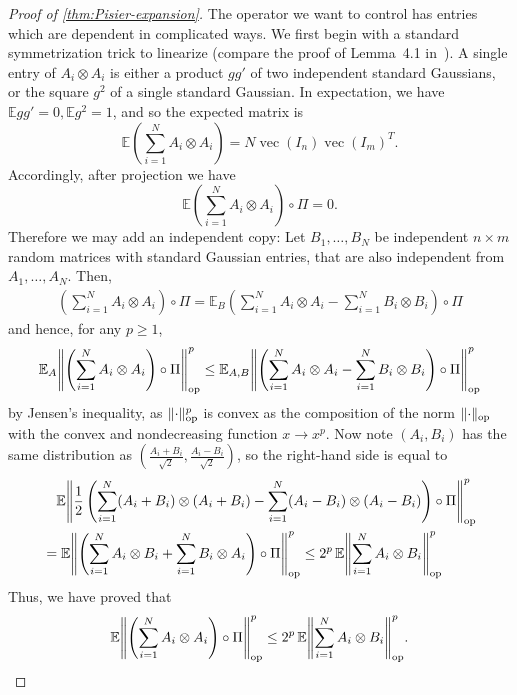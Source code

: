 \documentclass[aos]{imsart}
\theoremstyle{definition}
\numberwithin{equation}{section}
\DeclareMathOperator{\op}{op}
\DeclareMathOperator{\vect}{vec}
\DeclarePairedDelimiter{\norm}{\lVert}{\rVert}
\newcommand{\E}{\mathbb{E}}
\begin{document}
\begin{appendix}
\begin{proof} [Proof of \cref{thm:Pisier-expansion}]
The operator we want to control has entries which are dependent in complicated ways.
We first begin with a standard symmetrization trick to linearize (compare the proof of Lemma~4.1 in~\cite{P14}).
A single entry of $A_i \otimes A_i$ is either a product $g g'$ of two independent standard Gaussians, or the square $g^2$ of a single standard Gaussian.
In expectation, we have $\E g g' = 0, \E g^{2} = 1$, and so the expected matrix is
\[ \E \left( \sum_{i=1}^N A_i \otimes A_i \right) = N \vect(I_n) \vect(I_m)^T. \]
Accordingly, after projection we have
\[ \E \left( \sum_{i=1}^N A_i \otimes A_i \right) \circ \Pi = 0. \]
Therefore we may add an independent copy:
Let $B_1,\dots,B_N$ be independent $n\times m$ random matrices with standard Gaussian entries, that are also independent from~$A_1,\dots,A_N$.
Then,
\begin{align*}
  \left( \sum_{i=1}^N A_i \otimes A_i \right) \circ \Pi
= \E_B \left( \sum_{i=1}^N A_i \otimes A_i - \sum_{i=1}^N B_i \otimes B_i \right) \circ \Pi
\end{align*}
and hence, for any $p\geq1$,
\begin{align*}
  \E_{A} \norm*{\left( \sum_{i=1}^N A_i \otimes A_i \right) \circ \Pi}_{\op}^p
\leq \E_{A,B} \norm*{\left( \sum_{i=1}^N A_i \otimes A_i - \sum_{i=1}^N B_i \otimes B_i \right) \circ \Pi}_{\op}^p
\end{align*}
by Jensen's inequality, as $\norm{\cdot}_{\op}^p$ is convex as the composition of the norm $\norm{\cdot}_{\op}$ with the convex and nondecreasing function $x \to x^{p}$.
Now note $(A_i,B_i)$ has the same distribution as $(\frac{A_i+B_i}{\sqrt2},\frac{A_i-B_i}{\sqrt2})$, so the right-hand side is equal to
\begin{align*}
&\quad \E \norm*{ \frac{1}{2} \left( \sum_{i=1}^N (A_i + B_i) \otimes (A_i + B_i) - \sum_{i=1}^N (A_i - B_i) \otimes(A_i - B_i) \right) \circ \Pi}_{\op}^p \\
&= \E \norm*{\left( \sum_{i=1}^N A_i \otimes B_i + \sum_{i=1}^N B_i \otimes A_i \right) \circ \Pi}_{\op}^p
\leq 2^{p} \, \E \norm*{\sum_{i=1}^N A_i \otimes B_i}_{\op}^p
\end{align*}
Thus, we have proved that
\begin{align}\label{eq:symmetrization}
  \E \norm*{\left( \sum_{i=1}^N A_i \otimes A_i \right) \circ \Pi}_{\op}^p
\leq 2^{p} \, \E \norm*{\sum_{i=1}^N A_i \otimes B_i}_{\op}^p.
\end{align}

\end{proof}
\end{appendix}
\end{document}
